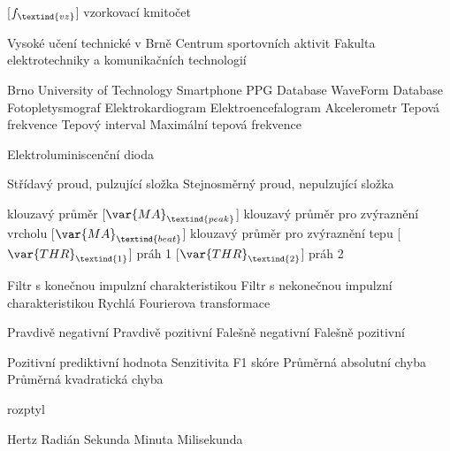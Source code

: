 \cleardoublepage
\chapter*{\listofabbrevname}
{}

\begin{acronym}[KolikMista]	%

		[\ensuremath{f_\textind{vz}}]
		{vzorkovací kmitočet}

			{Vysoké učení technické v Brně}
			{Centrum sportovních aktivit}
			{Fakulta elektrotechniky a komunikačních technologií}

		{Brno University of Technology Smartphone PPG Database}
			{WaveForm Database}
			{Fotopletysmograf}
			{Elektrokardiogram}
			{Elektroencefalogram}
			{Akcelerometr}
			{Tepová frekvence}
			{Tepový interval}
			{Maximální tepová frekvence}

			{Elektroluminiscenční dioda}

			{Střídavý proud, pulzující složka}
			{Stejnosměrný proud, nepulzující složka}

			{klouzavý průměr}
		[\ensuremath{\var{MA}_\textind{peak}}]
			{klouzavý průměr pro zvýraznění vrcholu}
		[\ensuremath{\var{MA}_\textind{beat}}]
		{klouzavý průměr pro zvýraznění tepu}
		[\ensuremath{\var{THR}_\textind{1}}]
		{práh 1}
		[\ensuremath{\var{THR}_\textind{2}}]
		{práh 2}
	
			{Filtr s konečnou impulzní charakteristikou}
			{Filtr s nekonečnou impulzní charakteristikou}
			{Rychlá Fourierova transformace}

			{Pravdivě negativní}	%
			{Pravdivě pozitivní}
			{Falešně negativní}
			{Falešně pozitivní}

			{Pozitivní prediktivní hodnota}
			{Senzitivita}
			{F1 skóre}
			{Průměrná absolutní chyba}
			{Průměrná kvadratická chyba}

			{rozptyl}

			{Hertz}
			{Radián}
			{Sekunda}
			{Minuta}
			{Milisekunda}


\end{acronym}
